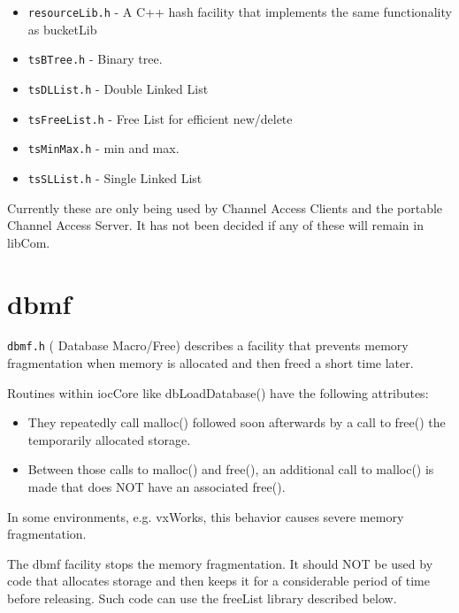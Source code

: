 \begin{itemize}\item \verb|resourceLib.h| - A C++ hash facility that implements the same functionality as bucketLib

\item \verb|tsBTree.h| - Binary tree.

\item \verb|tsDLList.h| - Double Linked List

\item \verb|tsFreeList.h| - Free List for efficient new/delete

\item \verb|tsMinMax.h| - min and max.

\item \verb|tsSLList.h| - Single Linked List

\end{itemize}
Currently these are only being used by Channel Access Clients and the portable Channel Access Server. It has not been 
decided if any of these will remain in libCom.

\section{dbmf}

 \verb|dbmf.h| ( Database Macro/Free) describes a facility that prevents memory fragmentation when memory is allocated and 
then freed a short time later.

Routines within iocCore like dbLoadDatabase() have the following attributes:

\begin{itemize}\item They repeatedly call malloc() followed soon afterwards by a call to free() the temporarily allocated storage.

\item Between those calls to malloc() and free(), an additional call to malloc() is made that does NOT have an associated 
free().

\end{itemize}In some environments, e.g. vxWorks, this behavior causes severe memory fragmentation.

The dbmf facility stops the memory fragmentation. It should NOT be used by code that allocates storage and then keeps it 
for a considerable period of time before releasing. Such code can use the freeList library described below.

